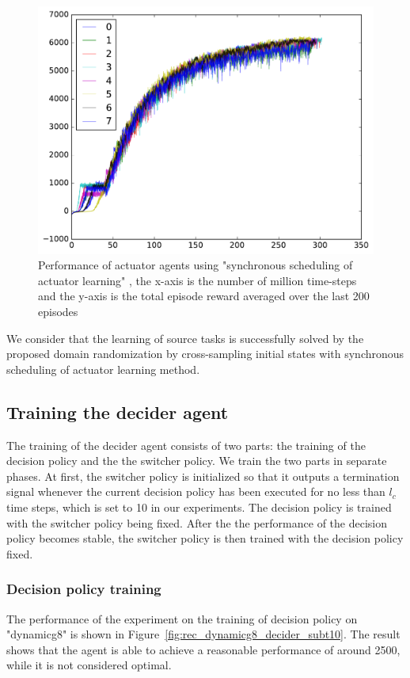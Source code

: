 \begin{figure}[!htbp]
	\includegraphics[width=\textwidth]{images/rec_sync_training.pdf}
	\centering
	\caption{Performance of actuator agents using "synchronous scheduling of actuator learning" , the x-axis is the number of million time-steps and the y-axis is the total episode reward averaged over the last 200 episodes}\label{rec_sync_training}
\end{figure}

We consider that the learning of source tasks is successfully solved by the proposed domain randomization by cross-sampling initial states with  synchronous scheduling of actuator learning method.
\subsection{Training the decider agent}
The training of the decider agent consists of two parts: the training of the decision policy and the the switcher policy. We train the two parts in separate phases. At first, the switcher policy is initialized so that it outputs a termination signal whenever the current decision policy has been executed for no less than $l_c$ time steps, which is set to 10 in our experiments. The decision policy is trained with the switcher policy being fixed. After the the performance of the decision policy becomes stable, the switcher policy is then trained with the decision policy fixed.
\subsubsection{Decision policy training}
The performance of the experiment on the training of decision policy on "dynamicg8" is shown in Figure~\ref{fig:rec_dynamicg8_decider_subt10}. The result shows that the agent is able to achieve a reasonable performance of around 2500, while it is not considered optimal.

